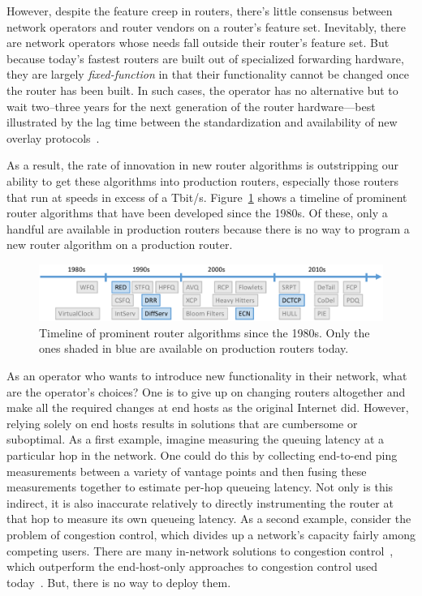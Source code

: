 However, despite the feature creep in routers, there's little consensus between
network operators and router vendors on a router's feature set. Inevitably,
there are network operators whose needs fall outside their router's feature
set. But because today's fastest routers are built out of specialized
forwarding hardware, they are largely {\em fixed-function} in that their
functionality cannot be changed once the router has been built. In such cases,
the operator has no alternative but to wait two--three years for the next
generation of the router hardware---best illustrated by the lag time between
the standardization and availability of new overlay protocols~\cite{vxlan,
nvgre}.

As a result, the rate of innovation in new router algorithms is outstripping
our ability to get these algorithms into production routers, especially those
routers that run at speeds in excess of a Tbit/s.
Figure~\ref{fig:router_algos} shows a timeline of prominent router algorithms
that have been developed since the 1980s. Of these, only a handful are
available in production routers because there is no way to program a new router
algorithm on a production router.

\begin{figure}
\centering
\includegraphics[width=\columnwidth]{router_alg_timeline.pdf}
\caption{Timeline of prominent router algorithms since the 1980s. Only the ones
shaded in blue are available on production routers today.}
\label{fig:router_algos}
\end{figure}

As an operator who wants to introduce new functionality in their network, what
are the operator's choices? One is to give up on changing routers altogether
and make all the required changes at end hosts as the original Internet did.
However, relying solely on end hosts results in solutions that are cumbersome
or suboptimal. As a first example, imagine measuring the queuing latency at a
particular hop in the network. One could do this by collecting end-to-end ping
measurements between a variety of vantage points and then fusing these
measurements together to estimate per-hop queueing latency. Not only is this
indirect, it is also inaccurate relatively to directly instrumenting the router
at that hop to measure its own queueing latency. As a second example, consider
the problem of congestion control, which divides up a network's capacity fairly
among competing users. There are many in-network solutions to congestion
control~\cite{xcp, rcp}, which outperform the end-host-only approaches to
congestion control used today~\cite{cubic, compound}. But, there is no way to
deploy them. 


